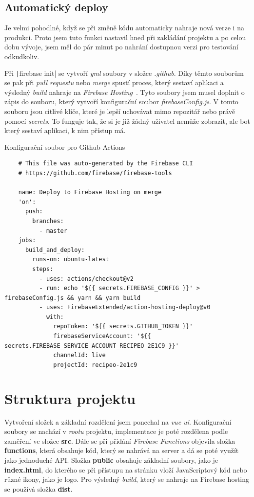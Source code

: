 \subsection{Automatický deploy}
Je velmi pohodlné, když se při změně kódu automaticky nahraje nová verze i na produkci. Proto jsem tuto funkci nastavil hned
při zakládání projektu a po celou dobu vývoje, jsem měl do pár minut po nahrání dostupnou verzi pro testování odkudkoliv.

Při \texttt|firebase init| se vytvoří \emph{yml} soubory v složce \emph{.github}. Díky těmto souborům se pak při
\emph{pull requestu} nebo \emph{merge} spustí proces, který sestaví aplikaci a výsledný \emph{build} nahraje na \emph{Firebase Hosting}~\cite{FirebaseDeploy}.
Tyto soubory jsem musel doplnit o zápis do souboru, který vytvoří konfigurační soubor \emph{firebaseConfig.js}. V tomto souboru jsou citlivé klíče, které je lepší
uchovávat mimo repozitář nebo právě pomocí \emph{secrets}. To funguje tak, že si je již žádný uživatel nemůže zobrazit, ale bot který sestaví aplikaci, k nim
přístup má.

\begin{listing}[h]
    \caption{Konfigurační soubor pro Github Actions}
    \begin{verbatim}
    # This file was auto-generated by the Firebase CLI
    # https://github.com/firebase/firebase-tools

    name: Deploy to Firebase Hosting on merge
    'on':
      push:
        branches:
          - master
    jobs:
      build_and_deploy:
        runs-on: ubuntu-latest
        steps:
          - uses: actions/checkout@v2
          - run: echo '${{ secrets.FIREBASE_CONFIG }}' > firebaseConfig.js && yarn && yarn build
          - uses: FirebaseExtended/action-hosting-deploy@v0
            with:
              repoToken: '${{ secrets.GITHUB_TOKEN }}'
              firebaseServiceAccount: '${{ secrets.FIREBASE_SERVICE_ACCOUNT_RECIPEO_2E1C9 }}'
              channelId: live
              projectId: recipeo-2e1c9
    \end{verbatim}
\end{listing}

\section{Struktura projektu}
Vytvoření složek a základní rozdělení jsem ponechal na \emph{vue ui}. Konfigurační soubory se nachází v \emph{rootu} projektu, implementace
je poté rozdělena podle zaměření ve složce \textbf{src}. Dále se při přidání \emph{Firebase Functions} objevila složka \textbf{functions}, která
obsahuje kód, který se nahrává na server a dá se poté využít jako jednoduché API. Složka \textbf{public} obsahuje základní soubory, jako je \textbf{index.html},
do kterého se při přístupu na stránku vloží JavaScriptový kód nebo různé ikony, jako je logo. Pro výsledný \emph{build}, který se nahraje na Firebase hosting se
používá složka \textbf{dist}.

